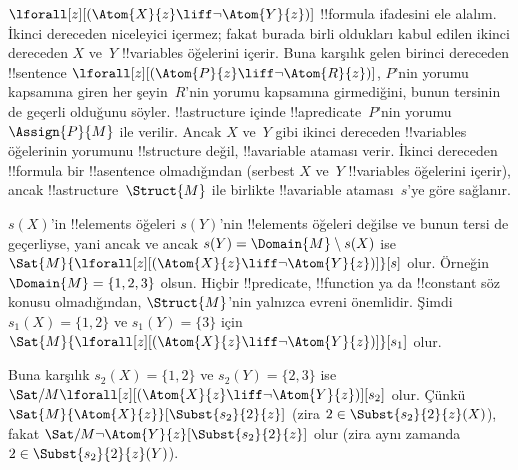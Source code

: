 \documentclass[../../../include/open-logic-section]{subfiles}
\begin{document}
\begin{ex}
  $\lforall[z][(\Atom{X}{z} \liff \lnot \Atom{Y}{z})]$ !!{formula}
  ifadesini ele alalım. İkinci dereceden niceleyici içermez; fakat burada
  birli oldukları kabul edilen ikinci dereceden $X$ ve~$Y$ !!{variable}s
  öğelerini içerir. Buna karşılık gelen birinci dereceden !!{sentence}
  $\lforall[z][(\Atom{P}{z} \liff \lnot \Atom{R}{z})]$, $P$'nin yorumu
  kapsamına giren her şeyin~$R$'nin yorumu kapsamına girmediğini, bunun
  tersinin de geçerli olduğunu söyler. !!a{structure} içinde
  !!a{predicate}~$P$'nin yorumu~$\Assign{P}{M}$ ile verilir. Ancak $X$
  ve~$Y$ gibi ikinci dereceden !!{variable}s öğelerinin yorumunu
  !!{structure} değil, !!a{variable} ataması verir. İkinci dereceden
  !!{formula} bir !!a{sentence} olmadığından (serbest $X$ ve~$Y$
  !!{variable}s öğelerini içerir), ancak !!a{structure}~$\Struct{M}$ ile
  birlikte !!a{variable} ataması~$s$'ye göre sağlanır.

  $s(X)$'in !!{element}s öğeleri $s(Y)$'nin !!{element}s öğeleri değilse
  ve bunun tersi de geçerliyse, yani ancak ve ancak
  $s(Y) = \Domain{M} \setminus s(X)$ ise
  $\Sat{M}{\lforall[z][(\Atom{X}{z} \liff \lnot \Atom{Y}{z})]}[s]$ olur.
  Örneğin $\Domain{M} = \{1, 2, 3\}$ olsun. Hiçbir !!{predicate},
  !!{function} ya da !!{constant} söz konusu olmadığından,
  $\Struct{M}$'nin yalnızca evreni önemlidir. Şimdi
  $s_1(X) = \{1, 2\}$ ve $s_1(Y) = \{3\}$ için
  $\Sat{M}{\lforall[z][(\Atom{X}{z}
      \liff \lnot \Atom{Y}{z})]}[s_1]$ olur.

  Buna karşılık $s_2(X) = \{1, 2\}$ ve $s_2(Y) = \{2, 3\}$ ise
  $\Sat/{M}{\lforall[z][(\Atom{X}{z} \liff \lnot
      \Atom{Y}{z})]}[s_2]$ olur. Çünkü
  $\Sat{M}{\Atom{X}{z}}[\Subst{s_2}{2}{z}]$ (zira
  $2 \in \Subst{s_2}{2}{z}(X)$), fakat
  $\Sat/{M}{\lnot \Atom{Y}{z}}[\Subst{s_2}{2}{z}]$ olur (zira aynı zamanda
  $2 \in \Subst{s_2}{2}{z}(Y)$).
\end{ex}
\end{document}
